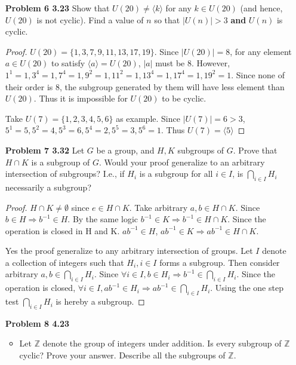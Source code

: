 \documentclass[11pt, oneside]{article}
\newcommand{\Z}{\mathbb Z}
\begin{document}
\begin{enumerate}
\begin{proof}
\end{proof}

\newpage
\item[{\bf Problem 6 3.23}] Show that $U(20)\neq \langle k \rangle$ for any $k\in U(20)$ (and hence, $U(20)$ is not cyclic). Find a value of $n$ so that $|U(n)|>3$ {\bf and} $U(n)$ is cyclic.

\begin{proof}
$U(20)=\{1, 3, 7, 9, 11, 13,17, 19\}$. Since $|U(20)|=8$, for any element $a\in U(20)$ to satisfy $\langle a \rangle=U(20)$, $|a|$ must be 8. However, $1^1=1, 3^4=1, 7^4=1, 9^2=1, 11^2=1, 13^4=1, 17^4=1, 19^2=1$. Since none of their order is 8, the subgroup generated by them will have less element than $U(20)$. Thus it is impossible for $U(20)$ to be cyclic. 

Take $U(7)=\{1,2,3,4,5,6 \}$ as example. Since $|U(7)|=6>3$, $5^1=5, 5^2=4, 5^3=6, 5^4=2, 5^5= 3, 5^6=1$. Thus $U(7)= \langle 5\rangle$
\end{proof}


\newpage
\item[{\bf Problem 7 3.32}] Let $G$ be a group, and $H, K$ subgroups of $G$. Prove that $H\cap K$ is a subgroup of $G$. Would your proof generalize to an arbitrary intersection of subgroups? I.e., if $H_i$ is a subgroup for all $i\in I$, is $\bigcap_{i\in I} H_i$ necessarily a subgroup?

\begin{proof}
$H\cap K\neq \emptyset$ since $e\in H\cap K$.  Take arbitrary $a, b \in H\cap K$. Since $b \in H \Rightarrow{} b^{-1}\in H$. By the same logic $b^{-1} \in K \Rightarrow{} b^{-1} \in H\cap K$. Since the operation is closed in H and K. $ab^{-1}\in H$, $ab^{-1}\in K \Rightarrow{} ab^{-1}\in H\cap K$.

\newline Yes the proof generalize to any arbitrary intersection of groups. Let $I$ denote a collection of integers such that $H_i, i\in I$ forms a subgroup. Then consider arbitrary $a,b \in \bigcap_{i\in I} H_i$. Since $\forall i\in I, b\in H_i \Rightarrow{} b^{-1} \in \bigcap_{i\in I} H_i$. Since the operation is closed, $\forall i\in I, ab^{-1} \in H_i\Rightarrow{}ab^{-1} \in \bigcap_{i\in I} H_i$. Using the one step test $\bigcap_{i\in I} H_i$ is hereby a subgroup. 
\end{proof}

\newpage
\item[{\bf Problem 8 4.23}] 

\begin{itemize}
\item Let $\Z$ denote the group of integers under addition. Is every subgroup of $\Z$ cyclic? Prove your answer. Describe all the subgroups of $\Z$.  


\end{itemize}
\end{enumerate}
\end{document}
